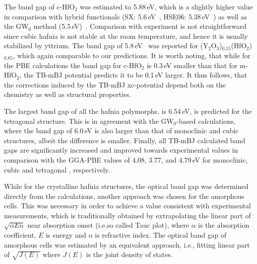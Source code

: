 \documentclass[10pt,a4paper,twocolumn]{article}
\begin{document}
The band gap of c-HfO$_2$ was estimated to 5.88\,eV, which is a slightly higher value in comparison with hybrid functionals (SX: 5.6\,eV~\cite{Clark2010}, HSE06: 5.38\,eV~\cite{Yang2014}) as well as the GW$_0$ method (5.5\,eV)~\cite{Gruning2010}.
Comparison with experiment is not straightforward since cubic hafnia is not stable at the room temperature, and hence it is usually stabilized by yttrium.
The band gap of 5.8\,eV~\cite{Lim2002} was reported for (Y$_2$O$_3$)$_{0.15}$(HfO$_2$)$_{0.85}$, which again comparable to our predictions.
It is worth noting, that while for the PBE calculations the band gap for c-HfO$_2$ is 0.3\,eV smaller than that for m-HfO$_2$, the TB-mBJ potential predicts it to be 0.1\,eV larger. 
It thus follows, that the corrections induced by the TB-mBJ xc-potential depend both on the chemistry as well as structural properties.

The largest band gap of all the hafnia polymorphs, is 6.54\,eV, is predicted for the tetragonal structure. 
This is in agreement with the GW$_0$-based calculations, where the band gap of 6.0\,eV is also larger than that of monoclinic and cubic structures, albeit the difference is smaller.
Finally, all TB-mBJ calculated band gaps are significantly increased and improved towards experimental values in comparison with the GGA-PBE values of 4.08, 3.77, and 4.79\,eV for monoclinic, cubic and tetragonal , respectively.

While for the crystalline hafnia structures, the optical band gap was determined directly from the calculations, another approach was chosen for the amorphous cells.
This was necessary in order to achieve a value consistent with experimental measurements, which is traditionally obtained by extrapolating the linear part of $\sqrt{\alpha E n}$ near absorption onset (i.e.so called Tauc plot), where $\alpha$ is the absorption coefficient, $E$ is energy and $n$ is refractive index. %
The optical band gap of amorphous cells was estimated by an equivalent approach, i.e., fitting linear part of $\sqrt{J(E)}$ where $J(E)$ is the joint density of states.
\end{document}
